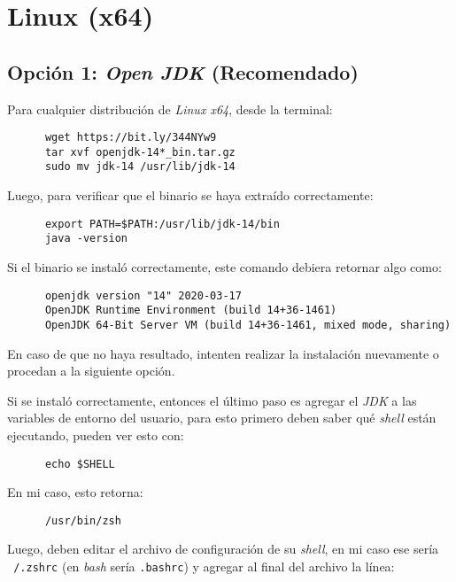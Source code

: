 \section{Linux (x64)}
  \subsection{Opción 1: \textit{Open JDK} (Recomendado)}
    Para cualquier distribución de \textit{Linux x64}, desde la terminal:

    \begin{verbatim}
      wget https://bit.ly/344NYw9
      tar xvf openjdk-14*_bin.tar.gz
      sudo mv jdk-14 /usr/lib/jdk-14
    \end{verbatim}

    Luego, para verificar que el binario se haya extraído correctamente:

    \begin{verbatim}
      export PATH=$PATH:/usr/lib/jdk-14/bin
      java -version
    \end{verbatim}

    Si el binario se instaló correctamente, este comando debiera retornar algo como:

    \begin{verbatim}
      openjdk version "14" 2020-03-17
      OpenJDK Runtime Environment (build 14+36-1461)
      OpenJDK 64-Bit Server VM (build 14+36-1461, mixed mode, sharing)
    \end{verbatim}

    En caso de que no haya resultado, intenten realizar la instalación nuevamente o 
    procedan a la siguiente opción.

    Si se instaló correctamente, entonces el último paso es agregar el \textit{JDK} a 
    las variables de entorno del usuario, para esto primero deben saber qué 
    \textit{shell} están ejecutando, pueden ver esto con:

    \begin{verbatim}
      echo $SHELL
    \end{verbatim}

    En mi caso, esto retorna:

    \begin{verbatim}
      /usr/bin/zsh
    \end{verbatim}

    Luego, deben editar el archivo de configuración de su \textit{shell}, en mi caso ese
    sería \texttt{~/.zshrc} (en \textit{bash} sería \texttt{.bashrc}) y 
    agregar al final del archivo la línea:
    
